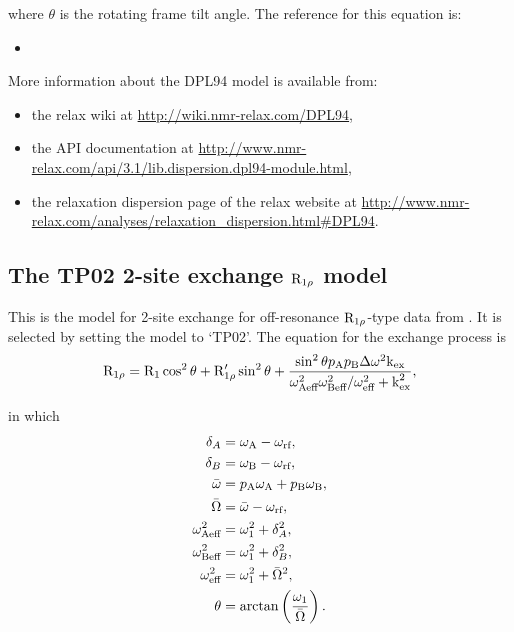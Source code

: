 where $\theta$ is the rotating frame tilt angle.
The reference for this equation is:
\begin{itemize}
  \item {}
\end{itemize}

More information about the DPL94 model is available from:
\begin{itemize}
  \item the relax wiki at \url{http://wiki.nmr-relax.com/DPL94},
  \item the API documentation at \url{http://www.nmr-relax.com/api/3.1/lib.dispersion.dpl94-module.html},
  \item the relaxation dispersion page of the relax website at \url{http://www.nmr-relax.com/analyses/relaxation\_dispersion.html#DPL94}.
\end{itemize}



\subsection{The TP02 2-site exchange $\mathrm{R}_{1\rho}$ model}
\label{sect: dispersion: TP02 model}

This is the model for 2-site exchange for off-resonance $\mathrm{R}_{1\rho}$-type data from \citet{TrottPalmer02}.
It is selected by setting the model to `TP02'.
The equation for the exchange process is
\begin{equation}
    \mathrm{R}_{1\rho} = \mathrm{R}_1\cos^2\theta + \mathrm{R}_{1\rho}'\sin^2\theta + \frac{\sin^2\theta p_\textrm{A}p_\textrm{B}\Delta\omega^2\textrm{k}_\textrm{ex}}{\omega_\textrm{Aeff}^2\omega_\textrm{Beff}^2/\omega_\textrm{eff}^2 + \textrm{k}_\textrm{ex}^2},
\end{equation}

in which
\begin{subequations}
\begin{align}
    \delta_A &= \omega_\textrm{A} - \omega_\textrm{rf}, \label{eq: deltaA}\\
    \delta_B &= \omega_\textrm{B} - \omega_\textrm{rf}, \label{eq: deltaB} \\
    \bar\omega &= p_\textrm{A}\omega_\textrm{A} + p_\textrm{B}\omega_\textrm{B}, \\
    \bar\Omega &= \bar\omega - \omega_\textrm{rf}, \\
    \omega_\textrm{Aeff}^2 &= \omega_1^2 + \delta_A^2, \\
    \omega_\textrm{Beff}^2 &= \omega_1^2 + \delta_B^2, \\
    \omega_\textrm{eff}^2 &= \omega_1^2 + \bar\Omega^2, \\
    \theta &= \arctan \left( \frac{\omega_1}{\bar\Omega} \right).
\end{align}
\end{subequations}

